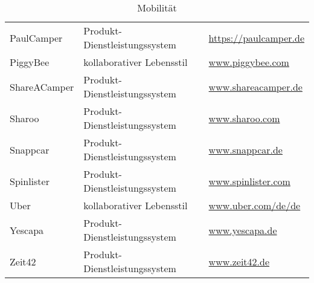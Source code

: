 \documentclass[a4paper]{scrartcl}
\begin{document}
\begin{table}[h]
\begin{tabular}{lll}
				PaulCamper & Produkt-Dienstleistungssystem & \url{https://paulcamper.de}\\
				PiggyBee & kollaborativer Lebensstil & \url{www.piggybee.com}\\
				ShareACamper & Produkt-Dienstleistungssystem & \url{www.shareacamper.de}\\
				Sharoo & Produkt-Dienstleistungssystem & \url{www.sharoo.com}\\
				Snappcar & Produkt-Dienstleistungssystem & \url{www.snappcar.de}\\
				Spinlister & Produkt-Dienstleistungssystem & \url{www.spinlister.com}\\
				Uber & kollaborativer Lebensstil & \url{www.uber.com/de/de}\\
				Yescapa & Produkt-Dienstleistungssystem & \url{www.yescapa.de}\\
				Zeit42 & Produkt-Dienstleistungssystem & \url{www.zeit42.de}
			\end{tabular}
		\caption{Mobilit\"at}
		\label{tab:Mobilit\"at}
		\end{table}
	
\end{document}
